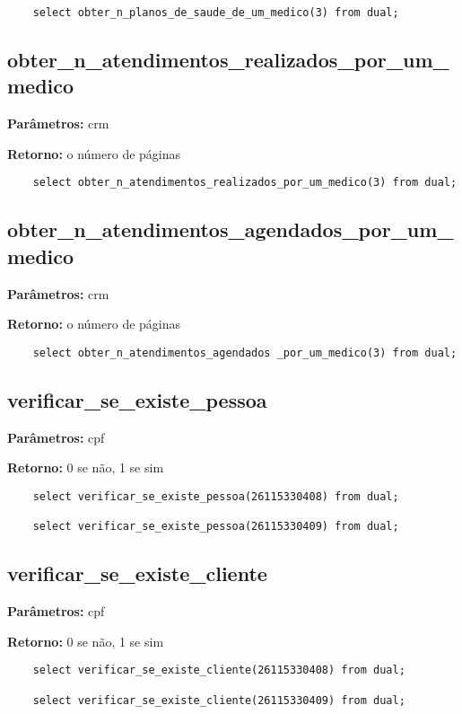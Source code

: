\begin{verbatim}
	select obter_n_planos_de_saude_de_um_medico(3) from dual;
\end{verbatim}

\subsection{obter\_n\_atendimentos\_realizados\_por\_um\_medico}

\textbf{Parâmetros:} crm

\textbf{Retorno:} o número de páginas

\begin{verbatim}
	select obter_n_atendimentos_realizados_por_um_medico(3) from dual;
\end{verbatim}

\subsection{obter\_n\_atendimentos\_agendados\_por\_um\_medico}

\textbf{Parâmetros:} crm

\textbf{Retorno:} o número de páginas

\begin{verbatim}
	select obter_n_atendimentos_agendados _por_um_medico(3) from dual;
\end{verbatim}


\subsection{verificar\_se\_existe\_pessoa}

\textbf{Parâmetros:} cpf

\textbf{Retorno:} 0 se não, 1 se sim

\begin{verbatim}
	select verificar_se_existe_pessoa(26115330408) from dual;
	
	select verificar_se_existe_pessoa(26115330409) from dual;
\end{verbatim}

\subsection{verificar\_se\_existe\_cliente}

\textbf{Parâmetros:} cpf

\textbf{Retorno:} 0 se não, 1 se sim

\begin{verbatim}
	select verificar_se_existe_cliente(26115330408) from dual;
	
	select verificar_se_existe_cliente(26115330409) from dual;
\end{verbatim}

